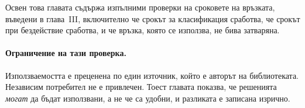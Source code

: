 Освен това главата съдържа изпълними проверки на сроковете на връзката, въведени в глава~III,
включително че срокът за класификация сработва, че срокът при бездействие сработва, и че
връзка, която се използва, не бива затваряна.

\paragraph{Ограничение на тази проверка.} Използваемостта е преценена по един източник, който
е авторът на библиотеката. Независим потребител не е привлечен. Тоест главата показва, че
решенията \emph{могат} да бъдат използвани, а не че са удобни, и разликата е записана изрично.
